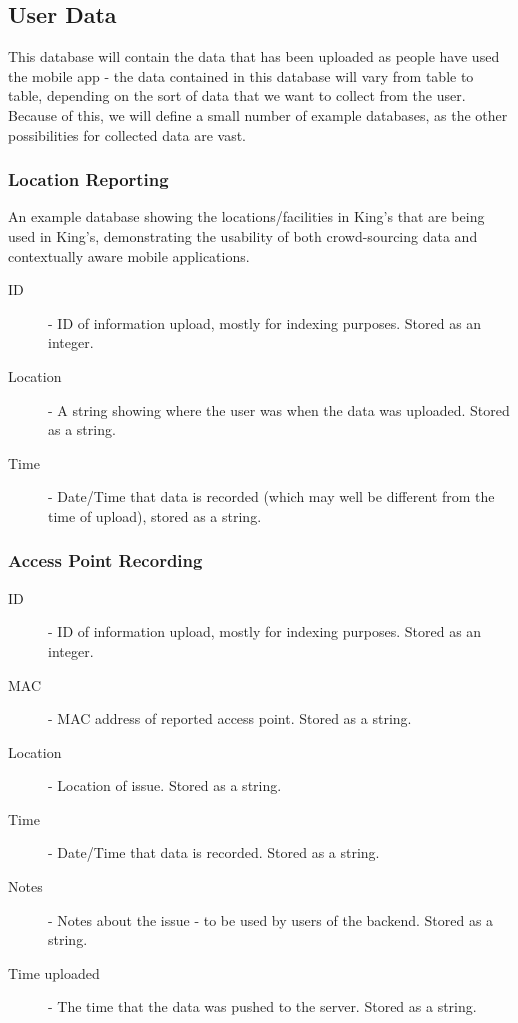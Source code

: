 \documentclass[11pt]{informatics-report}
\begin{document}
\subsection{User Data}

This database will contain the data that has been uploaded as people have used the mobile app - the data contained in this database will vary from table to table, depending on the sort of data that we want to collect from the user. Because of this, we will define a small number of example databases, as the other possibilities for collected data are vast. 
\newpage

\subsubsection{Location Reporting}

An example database showing the locations/facilities in King's that are being used in King's, demonstrating the usability of both crowd-sourcing data and contextually aware mobile applications. 

\begin{description}
\item[ID] - ID of information upload, mostly for indexing purposes. Stored as an integer.
\item[Location] - A string showing where the user was when the data was uploaded. Stored as a string.
\item[Time] - Date/Time that data is recorded (which may well be different from the time of upload), stored as a string.
\end{description}

\subsubsection{Access Point Recording}
\begin{description}
\item[ID] - ID of information upload, mostly for indexing purposes. Stored as an integer.
\item[MAC] - MAC address of reported access point. Stored as a string.
\item[Location] - Location of issue. Stored as a string.
\item[Time] - Date/Time that data is recorded. Stored as a string.
\item[Notes] - Notes about the issue - to be used by users of the backend. Stored as a string.
\item[Time uploaded] - The time that the data was pushed to the server. Stored as a string.
\end{description}
\end{document}
